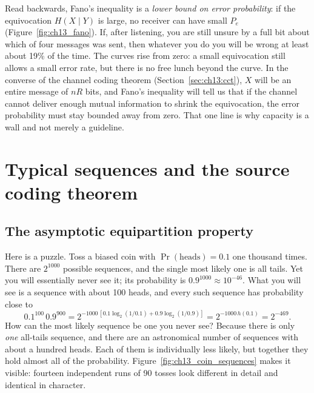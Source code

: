 Read backwards, Fano's inequality is a \emph{lower bound on error probability}: if the
equivocation $H(X\mid Y)$ is large, no receiver can have small $P_e$
(Figure~\ref{fig:ch13_fano}). If, after listening, you are still unsure by a full bit about which
of four messages was sent, then whatever you do you will be wrong at least about 19\% of the
time. The curves rise from zero: a small equivocation still allows a small error rate, but there
is no free lunch beyond the curve. In the converse of the channel coding theorem
(Section~\ref{sec:ch13:cct}), $X$ will be an entire message of $nR$ bits, and Fano's inequality
will tell us that if the channel cannot deliver enough mutual information to shrink the
equivocation, the error probability must stay bounded away from zero. That one line is why
capacity is a wall and not merely a guideline.

\section{Typical sequences and the source coding theorem}
\label{sec:ch13:source}

\subsection{The asymptotic equipartition property}

Here is a puzzle. Toss a biased coin with $\Pr(\text{heads})=0.1$ one thousand times. There are
$2^{1000}$ possible sequences, and the single most likely one is all tails. Yet you will
essentially never see it; its probability is $0.9^{1000}\approx10^{-46}$. What you will see is a
sequence with about 100 heads, and every such sequence has probability close to
\[
0.1^{100}\,0.9^{900}=2^{-1000\,[0.1\log_2(1/0.1)+0.9\log_2(1/0.9)]}=2^{-1000\,h(0.1)}=2^{-469}.
\]
How can the most likely sequence be one you never see? Because there is only \emph{one} all-tails
sequence, and there are an astronomical number of sequences with about a hundred heads. Each of
them is individually less likely, but together they hold almost all of the probability.
Figure~\ref{fig:ch13_coin_sequences} makes it visible: fourteen independent runs of 90 tosses look
different in detail and identical in character.


